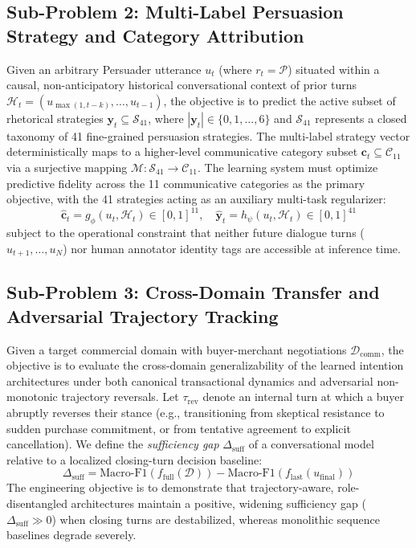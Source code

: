 \subsection{Sub-Problem 2: Multi-Label Persuasion Strategy and Category Attribution}
Given an arbitrary Persuader utterance $u_t$ (where $r_t = \mathcal{P}$) situated within a causal, non-anticipatory historical conversational context of prior turns $\mathcal{H}_t = (u_{\max(1, t-k)}, \dots, u_{t-1})$, the objective is to predict the active subset of rhetorical strategies $\mathbf{y}_t \subseteq \mathcal{S}_{41}$, where $|\mathbf{y}_t| \in \{0, 1, \dots, 6\}$ and $\mathcal{S}_{41}$ represents a closed taxonomy of 41 fine-grained persuasion strategies. The multi-label strategy vector deterministically maps to a higher-level communicative category subset $\mathbf{c}_t \subseteq \mathcal{C}_{11}$ via a surjective mapping $\mathcal{M}: \mathcal{S}_{41} \to \mathcal{C}_{11}$. The learning system must optimize predictive fidelity across the 11 communicative categories as the primary objective, with the 41 strategies acting as an auxiliary multi-task regularizer:
\begin{equation}
  \hat{\mathbf{c}}_t = g_\phi(u_t, \mathcal{H}_t) \in [0, 1]^{11}, \quad \hat{\mathbf{y}}_t = h_\psi(u_t, \mathcal{H}_t) \in [0, 1]^{41}
\end{equation}
subject to the operational constraint that neither future dialogue turns ($u_{t+1}, \dots, u_N$) nor human annotator identity tags are accessible at inference time.

\subsection{Sub-Problem 3: Cross-Domain Transfer and Adversarial Trajectory Tracking}
Given a target commercial domain with buyer-merchant negotiations $\mathcal{D}_{\text{comm}}$, the objective is to evaluate the cross-domain generalizability of the learned intention architectures under both canonical transactional dynamics and adversarial non-monotonic trajectory reversals. Let $\tau_{\text{rev}}$ denote an internal turn at which a buyer abruptly reverses their stance (e.g., transitioning from skeptical resistance to sudden purchase commitment, or from tentative agreement to explicit cancellation). We define the \textit{sufficiency gap} $\Delta_{\text{suff}}$ of a conversational model relative to a localized closing-turn decision baseline:
\begin{equation}
  \Delta_{\text{suff}} = \text{Macro-F1}(f_{\text{full}}(\mathcal{D})) - \text{Macro-F1}(f_{\text{last}}(u_{\text{final}}))
  \label{eq:sufficiency_gap}
\end{equation}
The engineering objective is to demonstrate that trajectory-aware, role-disentangled architectures maintain a positive, widening sufficiency gap ($\Delta_{\text{suff}} \gg 0$) when closing turns are destabilized, whereas monolithic sequence baselines degrade severely.

